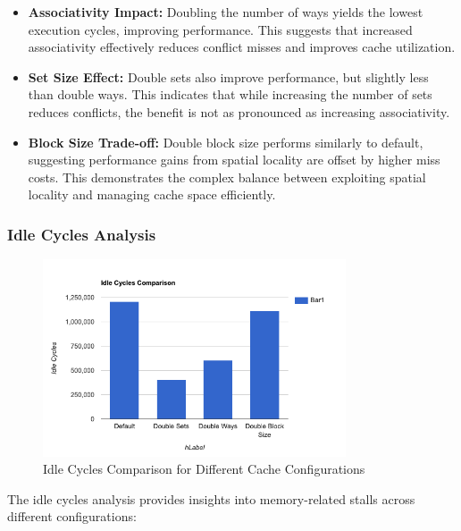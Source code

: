 \documentclass[10pt]{article}
\begin{document}
\begin{itemize}
    \item \textbf{Associativity Impact:} Doubling the number of ways yields the lowest execution cycles, improving performance. This suggests that increased associativity effectively reduces conflict misses and improves cache utilization.
    
    \item \textbf{Set Size Effect:} Double sets also improve performance, but slightly less than double ways. This indicates that while increasing the number of sets reduces conflicts, the benefit is not as pronounced as increasing associativity.
    
    \item \textbf{Block Size Trade-off:} Double block size performs similarly to default, suggesting performance gains from spatial locality are offset by higher miss costs. This demonstrates the complex balance between exploiting spatial locality and managing cache space efficiently.
\end{itemize}

\subsubsection{Idle Cycles Analysis}
\begin{figure}[H]
    \centering
    \includegraphics[width=0.8\textwidth]{./images/idle_cycles.png}
    \caption{Idle Cycles Comparison for Different Cache Configurations}
\end{figure}

The idle cycles analysis provides insights into memory-related stalls across different configurations:
\end{document}
